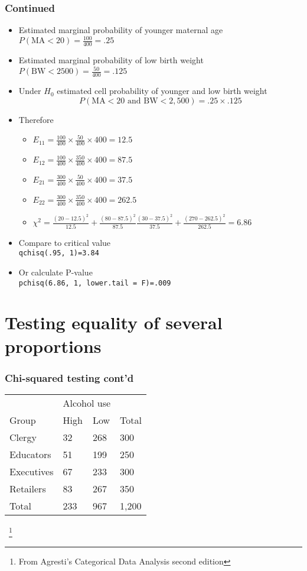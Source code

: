 \documentclass[aspectratio=169]{beamer}
\begin{document}
\begin{frame}\frametitle{Continued}
\begin{itemize}
\item Estimated marginal probability of younger maternal age $P\left(\mbox{MA}<20\right) = \frac{100}{400} = .25$
\item Estimated marginal probability of low birth weight $P\left(\mbox{BW}<2500\right) = \frac{50}{400} = .125$
\item Under $H_0$ estimated cell probability of younger and low birth weight 
  $$P\left(\mbox{MA}<20\mbox{ and BW}<2,500 \right) = .25 \times .125$$
\item Therefore
  \begin{itemize}
  \item $E_{11} = \frac{100}{400}\times\frac{50}{400}\times 400 = 12.5$
  \item $E_{12} = \frac{100}{400}\times\frac{350}{400}\times 400 = 87.5$
  \item $E_{21} = \frac{300}{400}\times\frac{50}{400}\times 400 = 37.5$
  \item $E_{22} = \frac{300}{400}\times\frac{350}{400}\times 400 = 262.5$
  \item $\chi^2 = \frac{(20 - 12.5)^2}{12.5} + \frac{(80- 87.5)^2}{87.5}
                  \frac{(30 - 37.5)^2}{37.5} + \frac{(270- 262.5)^2}{262.5}= 6.86$
  \end{itemize}
\item Compare to critical value \\
 \texttt{qchisq(.95, 1)=3.84}
\item Or calculate P-value \\ 
  \texttt{pchisq(6.86, 1, lower.tail = F)=.009}
\end{itemize}
\end{frame}

\section{Testing equality of several proportions}
\begin{frame}\frametitle{Chi-squared testing cont'd}
\ttfamily
\begin{center}
\begin{tabular}{llll}
& \multicolumn{2}{c}{Alcohol use} & \\
Group      & High & Low & Total \\ \hline
Clergy     & 32   & 268 & 300 \\
Educators  & 51   & 199 & 250 \\
Executives & 67   & 233 & 300 \\
Retailers  & 83   & 267 & 350 \\ \hline
Total      & 233  & 967 & 1,200
\end{tabular}
\end{center}
\normalfont
~\footnote{From Agresti's Categorical Data Analysis second edition}
\end{frame}
\end{document}
